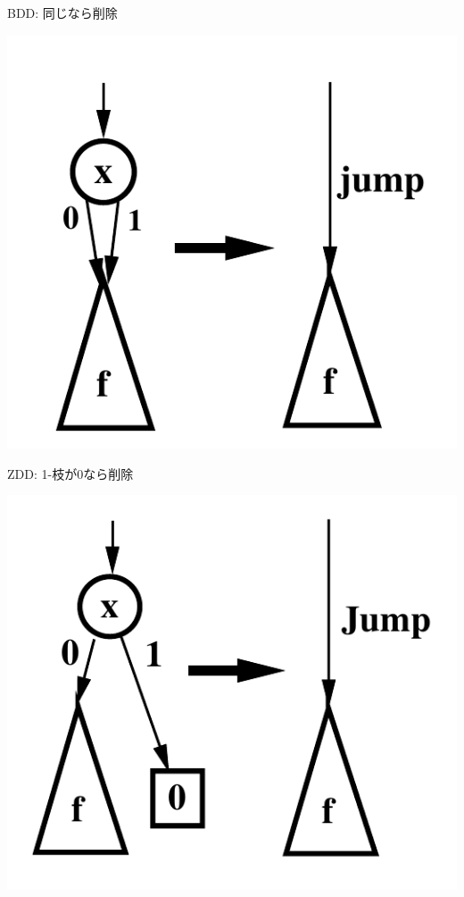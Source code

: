 \begin{container-fluid}
\begin{row-fluid}
\begin{span6}
\begin{center}
BDD: 同じなら削除
\end{center}
\includegraphics{img/static/reduction-rule-bdd.png}
\end{span6}
\begin{span6}
\begin{center}
ZDD: 1-枝が0なら削除
\end{center}
\includegraphics{img/static/reduction-rule-zdd.png}
\end{span6}
\end{row-fluid}
\end{container-fluid}

